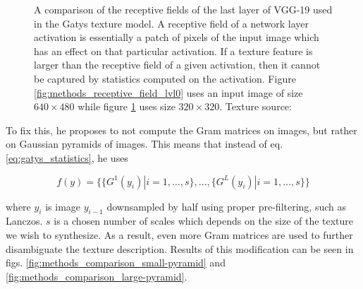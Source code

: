 \begin{figure}[]
\begin{subfigure}[b]{0.48\textwidth}
        \caption{}
        \label{fig:methods_receptive_field_lvl1}
    \end{subfigure}
    \caption{A comparison of the receptive fields of the last layer of VGG-19 used in the Gatys texture model. A receptive field of a network layer activation is essentially a patch of pixels of the input image which has an effect on that particular activation. If a texture feature is larger than the receptive field of a given activation, then it cannot be captured by statistics computed on the activation. Figure \ref{fig:methods_receptive_field_lvl0} uses an input image of size \(640 \times 480\) while figure \ref{fig:methods_receptive_field_lvl1} uses size \(320 \times 320\). Texture source: \citet{Pixar128}}
    \label{fig:methods_receptive_field}
\end{figure}

To fix this, he proposes to not compute the Gram matrices on images, but rather on Gaussian pyramids of images. This means that instead of eq. \ref{eq:gatys_statistics}, he uses

\begin{equation}
    \label{eq:snelgrove_statistics}
    f(y) = \{\{G^1(y_i) | i = 1, \dots, s\}, \dots, \{G^L(y_i) | i = 1, \dots, s\}\}
\end{equation}

where \(y_i\) is image \(y_{i - 1}\) downsampled by half using proper pre-filtering, such as Lanczos. \(s\) is a chosen number of scales which depends on the size of the texture we wish to synthesize. As a result, even more Gram matrices are used to further disambiguate the texture description. Results of this modification can be seen in figs. \ref{fig:methods_comparison_small-pyramid} and \ref{fig:methods_comparison_large-pyramid}.

